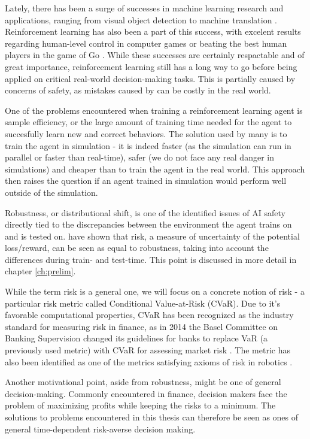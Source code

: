 Lately, there has been a surge of successes in machine learning research and applications, ranging from visual object detection \cite{krizhevsky2012imagenet} to machine translation \citep{bahdanau2014neural}. Reinforcement learning has also been a part of this success, with excelent results regarding human-level control in computer games \cite{mnih2015human} or beating the best human players in the game of Go \citep{silver2017mastering}. While these successes are certainly respactable and of great importance, reinforcement learning still has a long way to go before being applied on critical real-world decision-making tasks. This is partially caused by concerns of safety, as mistakes caused by can be costly in the real world.

One of the problems encountered when training a reinforcement learning agent is sample efficiency, or the large amount of training time needed for the agent to succesfully learn new and correct behaviors. The solution used by many is to train the agent in simulation - it is indeed faster (as the simulation can run in parallel or faster than real-time), safer (we do not face any real danger in simulations) and cheaper than to train the agent in the real world.
This approach then raises the question if an agent trained in simulation would perform well outside of the simulation.

Robustness, or distributional shift, is one of the identified issues of AI safety \citep{leike2017ai}\citep{amodei2016concrete} directly tied to the discrepancies between the environment the agent trains on and is tested on. \citet{chow2015risk} have shown that risk, a measure of uncertainty of the potential loss/reward, can be seen as equal to robustness, taking into account the differences during train- and test-time. This point is discussed in more detail in chapter \ref{ch:prelim}.

While the term risk is a general one, we will focus on a concrete notion of risk - a particular risk metric called Conditional Value-at-Risk (CVaR). 
Due to it's favorable computational properties, CVaR has been recognized as the industry standard for measuring risk in finance, as in 2014 the Basel Committee on Banking Supervision changed its guidelines for banks to replace VaR (a previously used metric) with CVaR for assessing market risk \citet{basel2013fundamental}. The metric has also been identified as one of the metrics satisfying axioms of risk in robotics \cite{majumdar2017should}.

Another motivational point, aside from robustness, might be one of general decision-making. Commonly encountered in finance, decision makers face the problem of maximizing profits while keeping the risks to a minimum. The solutions to problems encountered in this thesis can therefore be seen as ones of general time-dependent risk-averse decision making.

